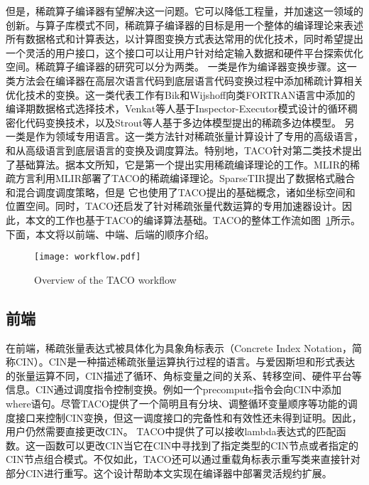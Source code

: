 但是，稀疏算子编译器有望解决这一问题。它可以降低工程量，并加速这一领域的创新。与算子库模式不同，稀疏算子编译器的目标是用一个整体的编译理论来表述所有数据格式和计算表达，以计算图变换方式表达常用的优化技术，同时希望提出一个灵活的用户接口，这个接口可以让用户针对给定输入数据和硬件平台探索优化空间。稀疏算子编译器的研究可以分为两类。
一类是作为编译器变换步骤。这一类方法会在编译器在高层次语言代码到底层语言代码变换过程中添加稀疏计算相关优化技术的变换。这一类代表工作有Bik和Wijshoff向类FORTRAN语言中添加的编译期数据格式选择技术\cite{bik1993compilation}，Venkat等人基于Inspector-Executor模式设计的循环稠密化代码变换技术，以及Strout等人基于多边体模型\cite{polyhedral}提出的稀疏多边体模型\cite{strout2018sparse}。
另一类是作为领域专用语言。这一类方法针对稀疏张量计算设计了专用的高级语言，和从高级语言到底层语言的变换及调度算法\cite{SparseTIR,kjolstad:2020:phd-thesis,bik2022compiler}。特别地，TACO\cite{kjolstad:2017:taco,kjolstad:2019:workspaces,kjolstad:2020:phd-thesis,senanayake:2020:scheduling}针对第二类技术提出了基础算法。据本文所知，它是第一个提出实用稀疏编译理论的工作。MLIR的稀疏方言\cite{bik2022compiler}利用MLIR部署了TACO的稀疏编译理论。SparseTIR\cite{SparseTIR}提出了数据格式融合和混合调度调度策略，但是
它也使用了TACO提出的基础概念，诸如坐标空间和位置空间。同时，TACO还启发了针对稀疏张量代数运算的专用加速器设计\cite{qin2022HardTACO}。因此，本文的工作也基于TACO的编译算法基础。TACO的整体工作流如图~\ref{fig:tacoworkflow}所示。下面，本文将以前端、中端、后端的顺序介绍。
\begin{figure}[h]%
  \centering
  \texttt{[image: workflow.pdf]}
  \caption{Overview of the TACO workflow}\label{fig:tacoworkflow}
\end{figure}
\subsection{前端}
在前端，稀疏张量表达式被具体化为具象角标表示（Concrete Index Notation，简称CIN）\cite{kjolstad:2019:workspaces}。CIN是一种描述稀疏张量运算执行过程的语言。与爱因斯坦和形式表达的张量运算不同，CIN描述了循环、角标变量之间的关系、转移空间、硬件平台等信息。CIN通过调度指令控制变换。例如一个precompute指令会向CIN中添加where语句。尽管TACO提供了一个简明且有分块、调整循环变量顺序等功能的调度接口来控制CIN变换，但这一调度接口的完备性和有效性还未得到证明\cite{ahrens:2022:autoscheduling}。因此，用户仍然需要直接更改CIN。
TACO中提供了可以接收lambda表达式的匹配函数。这一函数可以更改CIN当它在CIN中寻找到了指定类型的CIN节点或者指定的CIN节点组合模式。不仅如此，TACO还可以通过重载角标表示重写类来直接针对部分CIN进行重写。这个设计帮助本文实现在编译器中部署灵活规约扩展。
